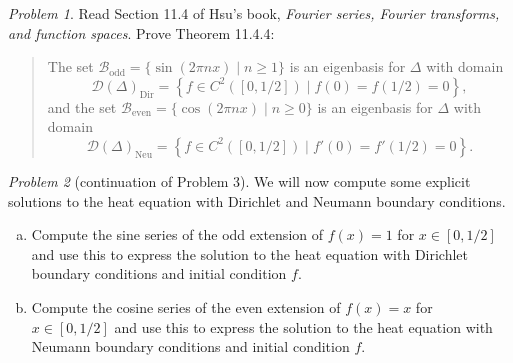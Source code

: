 \documentclass[11pt,twoside]{amsart}
\theoremstyle{plain}
\theoremstyle{remark}
\newtheorem{prob}{Problem}
\theoremstyle{definition}
\theoremstyle{definition}
\begin{document}

\begin{prob}
Read Section 11.4 of Hsu's book, \emph{Fourier series, Fourier transforms, and function spaces}. Prove Theorem 11.4.4:
\begin{quote}
The set $\mathscr B_{\text{odd}} = \{\sin(2\pi n x)\mid n\ge 1\}$ is an eigenbasis for $\Delta$ with domain
\[
  \mathscr D(\Delta)_{\text{Dir}} = \left\{ f\in C^2([0,1/2])\mid  f(0) = f(1/2) = 0 \right\},
\]
and the set $\mathscr B_{\text{even}} = \{\cos(2\pi nx)\mid n\ge 0\}$ is an eigenbasis for $\Delta$ with domain
\[
  \mathscr D(\Delta)_{\text{Neu}} = \left\{ f\in C^2([0,1/2]) \mid f'(0)=f'(1/2)=0 \right\}.
\]
\end{quote}
\end{prob}


\begin{prob}[continuation of Problem 3]
We will now compute some explicit solutions to the heat equation with Dirichlet and Neumann boundary conditions.
\begin{enumerate}[(a)]
\item Compute the sine series of the odd extension of $f(x)=1$ for $x\in [0,1/2]$ and use this to express the solution to the heat equation with Dirichlet boundary conditions and initial condition $f$.
\item Compute the cosine series of the even extension of $f(x)=x$ for $x\in [0,1/2]$ and use this to express the solution to the heat equation with Neumann boundary conditions and initial condition $f$.
\end{enumerate}
\end{prob}

\end{document}
